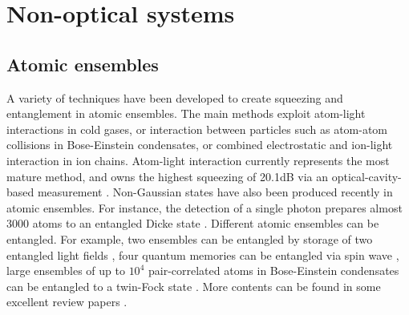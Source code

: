 %
%

\section{Non-optical systems} 

%
%

\subsection{Atomic ensembles} 

A variety of techniques have been developed to create squeezing and entanglement in atomic ensembles. The main methods exploit atom-light interactions in cold gases, or interaction between particles such as atom-atom collisions in Bose-Einstein condensates, or combined electrostatic and ion-light interaction in ion chains. Atom-light interaction currently represents the most mature method, and owns the highest squeezing of 20.1dB via an optical-cavity-based measurement \cite{bib:hosten2016measurement}. Non-Gaussian states have also been produced recently in atomic ensembles. For instance, the detection of a single photon prepares almost 3000 atoms to an entangled Dicke state \cite{bib:mcconnell2015entanglement}. Different atomic ensembles can be entangled. For example, two ensembles can be entangled by storage of two entangled light fields \cite{bib:lukin2000entanglement}, four quantum memories can be entangled via spin wave \cite{bib:choi2010entanglement}, large ensembles of up to $10^4$ pair-correlated atoms in Bose-Einstein condensates can be entangled to a twin-Fock state \cite{bib:lucke2011twin}. More contents can be found in some excellent review papers \cite{bib:kimble2008quantum, bib:hammerer2010quantum, bib:sangouard2011quantum, bib:pezze2016non}.

